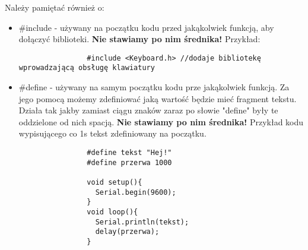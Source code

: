 	Należy pamiętać również o:
	\begin{itemize}
		\item #include - używany na początku kodu przed jakąkolwiek funkcją, aby dołączyć biblioteki. \textbf{Nie stawiamy po nim średnika!} Przykład:
			\begin{verbatim}
				#include <Keyboard.h> //dodaje bibliotekę wprowadzającą obsługę klawiatury
			\end{verbatim}
		\item #define - używany na samym początku kodu prze jakąkolwiek funkcją. Za jego pomocą możemy zdefiniować jaką wartość będzie mieć fragment tekstu.
		Działa tak jakby zamiast ciągu znaków zaraz po słowie "define" były te oddzielone od nich spacją. \textbf{Nie stawiamy po nim średnika!} Przykład kodu wypisującego co 1s tekst zdefiniowany na początku.
			\begin{verbatim}
				#define tekst "Hej!"
				#define przerwa 1000
				
				void setup(){
				  Serial.begin(9600);
				}
				void loop(){
				  Serial.println(tekst);
				  delay(przerwa);
				}
			\end{verbatim}
	\end{itemize}
